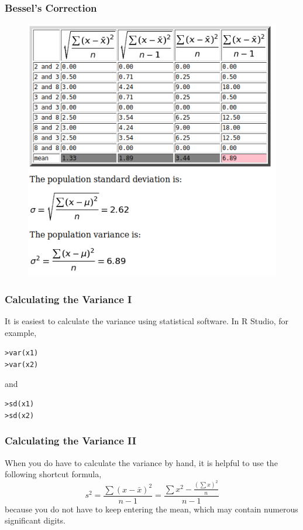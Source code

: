 \documentclass[xcolor=dvipsnames]{beamer}
\begin{document}
\begin{frame}
  \frametitle{Bessel's Correction}
\begin{figure}[h]
\includegraphics[scale=.45]{./bessel.png}
\end{figure}
\end{frame}

\begin{frame}
  \frametitle{Calculating the Variance I}
It is easiest to calculate the variance using statistical software. In
R Studio, for example,
\begin{alltt}
> var(x1)\newline
> var(x2)
\end{alltt}
and
\begin{alltt}
> sd(x1)\newline
> sd(x2)
\end{alltt}
\end{frame}

\begin{frame}
  \frametitle{Calculating the Variance II}
When you do have to calculate the variance by hand, it is helpful to
use the following shortcut formula,
\begin{equation}
  \label{eq:eecheaxe}
s^{2}=\frac{\sum(x-\bar{x})^{2}}{n-1}=\frac{\sum{}x^{2}-\frac{\left(\sum{}x\right)^{2}}{n}}{n-1}
\end{equation}
because you do not have to keep entering the mean, which may contain
numerous significant digits.
\end{frame}
\end{document}
